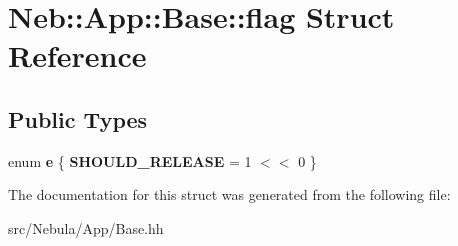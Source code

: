 \hypertarget{structNeb_1_1App_1_1Base_1_1flag}{\section{Neb\-:\-:App\-:\-:Base\-:\-:flag Struct Reference}
\label{structNeb_1_1App_1_1Base_1_1flag}
}
\subsection*{Public Types}
\begin{DoxyCompactItemize}
\item 
enum {\bfseries e} \{ {\bfseries S\-H\-O\-U\-L\-D\-\_\-\-R\-E\-L\-E\-A\-S\-E} = 1 $<$$<$ 0
 \}
\end{DoxyCompactItemize}


The documentation for this struct was generated from the following file\-:\begin{DoxyCompactItemize}
\item 
src/\-Nebula/\-App/Base.\-hh\end{DoxyCompactItemize}
